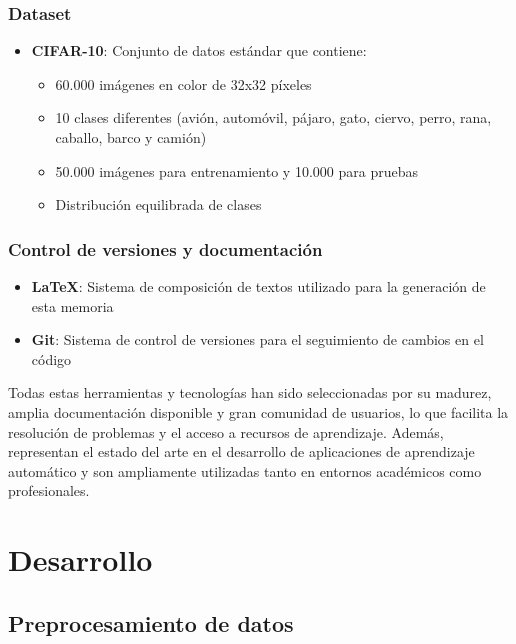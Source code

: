 \documentclass[11pt,a4paper]{article}
\begin{document}
\subsubsection{Dataset}
\begin{itemize}
    \item \textbf{CIFAR-10}: Conjunto de datos estándar que contiene:
    \begin{itemize}
        \item 60.000 imágenes en color de 32x32 píxeles
        \item 10 clases diferentes (avión, automóvil, pájaro, gato, ciervo, perro, rana, caballo, barco y camión)
        \item 50.000 imágenes para entrenamiento y 10.000 para pruebas
        \item Distribución equilibrada de clases
    \end{itemize}
\end{itemize}

\subsubsection{Control de versiones y documentación}
\begin{itemize}
    \item \textbf{\LaTeX}: Sistema de composición de textos utilizado para la generación de esta memoria
    \item \textbf{Git}: Sistema de control de versiones para el seguimiento de cambios en el código
\end{itemize}

Todas estas herramientas y tecnologías han sido seleccionadas por su madurez, amplia documentación disponible y gran comunidad de usuarios, lo que facilita la resolución de problemas y el acceso a recursos de aprendizaje. Además, representan el estado del arte en el desarrollo de aplicaciones de aprendizaje automático y son ampliamente utilizadas tanto en entornos académicos como profesionales.

\newpage

\section{Desarrollo}

\subsection{Preprocesamiento de datos}
\end{document}
